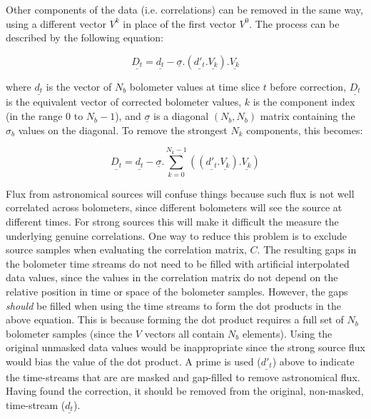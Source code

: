 \documentclass{article}
\renewcommand{\vec}[1]{\underline{#1}}
\begin{document}
Other components of the data  (i.e. correlations) can be removed in the same way,
using a different vector $V^k$ in place of the first vector $V^0$. The process
can be described by the following equation:

\begin{equation*}
\vec{D_t} = \vec{d_t} - \vec{\sigma}.(\vec{d'_t}.\vec{V_k}).\vec{V_k}
\end{equation*}

where $\vec{d_t}$ is the vector of $N_b$ bolometer values at time slice
$t$ before correction, $\vec{D_t}$ is the equivalent vector of corrected
bolometer values, $k$ is the component index (in the range 0 to
$N_b-1$), and $\vec{\sigma}$ is a diagonal $(N_b,N_b)$ matrix containing
the $\sigma_b$ values on the diagonal. To remove the strongest $N_k$ components,
this becomes:

\begin{equation}
\label{eq:1}
\vec{D_t} = \vec{d_t} - \vec{\sigma}.\sum_{k=0}^{N_k-1}( (\vec{d'_t}.\vec{V_k}).\vec{V_k} )
\end{equation}

Flux from astronomical sources will confuse things because such flux is
not well correlated across bolometers, since different bolometers will
see the source at different times. For strong sources this will make it
difficult the measure the underlying genuine correlations. One way to
reduce this problem is to exclude source samples when evaluating the
correlation matrix, $C$. The resulting gaps in the bolometer time streams
do not need to be filled with artificial interpolated data values, since
the values in the correlation matrix do not depend on the relative
position in time or space of the bolometer samples. However, the gaps
\emph{should} be filled when using the time streams to form the dot
products in the above equation. This is because forming the dot product
requires a full set of $N_b$ bolometer samples (since the $V$ vectors all
contain $N_b$ elements). Using the original unmasked data values would be
inappropriate since the strong source flux would bias the value of the
dot product. A prime is used ($\vec{d'_t}$) above to indicate the
time-streams that are are masked and gap-filled to remove astronomical
flux. Having found the correction, it should be removed from the original,
non-masked, time-stream ($\vec{d_t}$).
\end{document}
